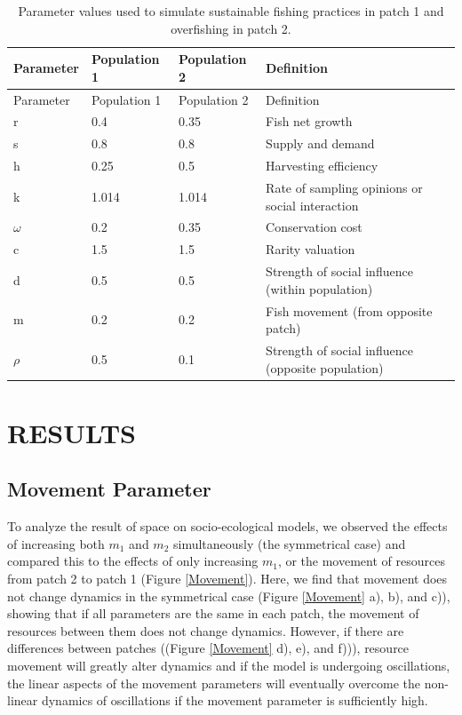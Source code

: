 \documentclass[
  12pt,
]{article}
\begin{document}
\begin{longtable}[]{@{}llll@{}}
\caption{\label{tab:DispersionParamTable}Parameter values used to simulate sustainable fishing practices in patch 1 and overfishing in patch 2. \label{DispersionParamTable}}\tabularnewline
\toprule\noalign{}
Parameter & Population 1 & Population 2 & Definition \\
\midrule\noalign{}
\endfirsthead
\toprule\noalign{}
Parameter & Population 1 & Population 2 & Definition \\
\midrule\noalign{}
\endhead
\bottomrule\noalign{}
\endlastfoot
r & 0.4 & 0.35 & Fish net growth \\
s & 0.8 & 0.8 & Supply and demand \\
h & 0.25 & 0.5 & Harvesting efficiency \\
k & 1.014 & 1.014 & Rate of sampling opinions or social interaction \\
\(\omega\) & 0.2 & 0.35 & Conservation cost \\
c & 1.5 & 1.5 & Rarity valuation \\
d & 0.5 & 0.5 & Strength of social influence (within population) \\
m & 0.2 & 0.2 & Fish movement (from opposite patch) \\
\(\rho\) & 0.5 & 0.1 & Strength of social influence (opposite population) \\
\end{longtable}

\hypertarget{results}{%
\section{RESULTS}\label{results}}

\hypertarget{movement-parameter}{%
\subsection{Movement Parameter}\label{movement-parameter}}

To analyze the result of space on socio-ecological models, we observed the effects of increasing both \(m_1\) and \(m_2\) simultaneously (the symmetrical case) and compared this to the effects of only increasing \(m_1\), or the movement of resources from patch 2 to patch 1 (Figure \ref{Movement}). Here, we find that movement does not change dynamics in the symmetrical case (Figure \ref{Movement} a), b), and c)), showing that if all parameters are the same in each patch, the movement of resources between them does not change dynamics. However, if there are differences between patches ((Figure \ref{Movement} d), e), and f))), resource movement will greatly alter dynamics and if the model is undergoing oscillations, the linear aspects of the movement parameters will eventually overcome the non-linear dynamics of oscillations if the movement parameter is sufficiently high.
\end{document}
